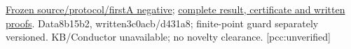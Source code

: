 \documentclass[10pt,a4paper]{article}
\begin{document}
\href{https://github.com/isogeny-labs/crypto/tree/257bf0f170d578d268454813a093de270c9906c5/research/chained_cm19_actual_j4_20261123}{Frozen source/protocol/firstA negative};
\href{https://github.com/isogeny-labs/crypto/tree/62db83d43c31b028fa8fb68be94bf2caa2b53845/research/chained_cm19_actual_j4_20261123}{complete result, certificate and written proofs}.
Data8b15b2, written3c0acb/d431a8; finite-point guard separately versioned.
KB/Conductor unavailable; no novelty clearance. [pcc:unverified]
\end{document}

